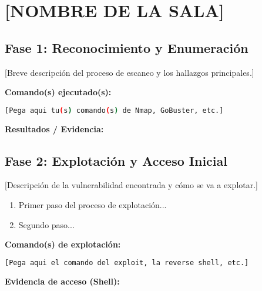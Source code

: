 
\section{[NOMBRE DE LA SALA]}

\subsection{Fase 1: Reconocimiento y Enumeración}
[Breve descripción del proceso de escaneo y los hallazgos principales.]

\textbf{Comando(s) ejecutado(s):}
\begin{lstlisting}[language=bash]
[Pega aqui tu(s) comando(s) de Nmap, GoBuster, etc.]
\end{lstlisting}

\textbf{Resultados / Evidencia:}
%
%

\subsection{Fase 2: Explotación y Acceso Inicial}
[Descripción de la vulnerabilidad encontrada y cómo se va a explotar.]

\begin{enumerate}
    \item Primer paso del proceso de explotación...
    \item Segundo paso...
\end{enumerate}

\textbf{Comando(s) de explotación:}
\begin{lstlisting}[language=bash]
[Pega aqui el comando del exploit, la reverse shell, etc.]
\end{lstlisting}

\textbf{Evidencia de acceso (Shell):}
%
%


